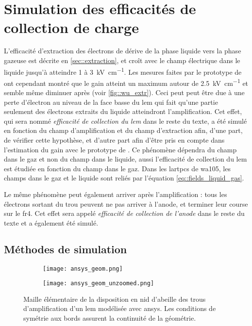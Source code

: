   \section{Simulation des efficacités de collection de charge}\label{sec::efficacites}
    
    L'efficacité d'extraction des électrons de dérive de la phase liquide vers la phase gazeuse est décrite en \autoref{sec::extraction}, et croît avec le champ électrique dans le liquide jusqu'à atteindre 1 à \SI{3}{\kilo\volt\per\centi\meter}. Les mesures faites par le prototype de \threeL{} ont cependant montré que le gain atteint un maximum autour de \SI{2.5}{\kilo\volt\per\centi\meter} et semble même diminuer après\cite{Wu2017} (voir \autoref{fig::wu_extr}). Ceci peut peut être due à une perte d'électron au niveau de la face basse du \gls{lem} qui fait qu'une partie seulement des électrons extraits du liquide atteindront l'amplification. Cet effet, qui sera nommé \textit{efficacité de collection du \gls{lem}} dans le reste du texte, a été simulé en fonction du champ d'amplification et du champ d'extraction afin, d'une part, de vérifier cette hypothèse, et d'autre part afin d'être pris en compte dans l'estimation du gain avec le prototype de \TOO{}. Ce phénomène dépendra du champ dans le gaz et non du champ dans le liquide, aussi l'efficacité de collection du \gls{lem} est étudiée en fonction du champ dans le gaz. Dans les \glspl{lartpc} de \gls{wa105}, les champs dans le gaz et le liquide sont reliés par l'équation \eqref{eq::fields_liquid_gas}.

    Le même phénomène peut également arriver après l'amplification : tous les électrons sortant du trou peuvent ne pas arriver à l'anode, et terminer leur course sur le \gls{fr4}. Cet effet sera appelé \textit{efficacité de collection de l'anode} dans le reste du texte et a également été simulé.
    
    \subsection{Méthodes de simulation}
        
      \begin{figure}[!htb]
        \begin{subfigure}[t]{0.48\textwidth}
          \texttt{[image: ansys\_geom.png]}
        \end{subfigure}
        \hfill
        \begin{subfigure}[t]{0.48\textwidth}
          \texttt{[image: ansys\_geom\_unzoomed.png]}
        \end{subfigure}
        \caption[Maille élémentaire d'un LEM modélisée avec ANSYS]{\label{fig::ansys_geom}Maille élémentaire de la disposition en nid d'abeille des trous d'amplification d'un \gls{lem} modélisée avec \gls{ansys}. Les conditions de symétrie aux bords assurent la continuité de la géométrie.}
      \end{figure}
            
